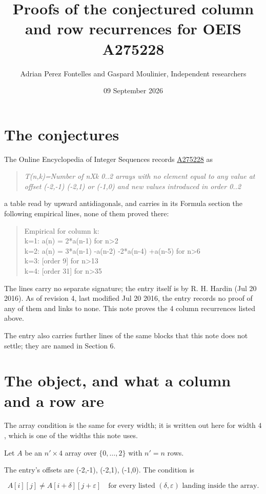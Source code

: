 \documentclass[11pt]{article}
\title{Proofs of the conjectured column and row recurrences for OEIS A275228}
\author{Adrian Perez Fontelles and Gaspard Moulinier, Independent researchers}
\date{09 September 2026}
\theoremstyle{definition}
\begin{document}
\maketitle
\section{The conjectures}

The Online Encyclopedia of Integer Sequences records \href{https://oeis.org/A275228}{A275228} as

\begin{quote}\itshape T(n,k)=Number of nXk 0..2 arrays with no element equal to any value at offset (-2,-1) (-2,1) or (-1,0) and new values introduced in order 0..2\end{quote}

a table read by upward antidiagonals, and carries in its Formula section the following empirical lines, none of them proved there:

\begin{quote}\ttfamily Empirical for column k:\\
k=1: a(n) = 2*a(n-1) for n>2\\k=2: a(n) = 3*a(n-1) -a(n-2) -2*a(n-4) +a(n-5) for n>6\\k=3: [order 9] for n>13\\k=4: [order 31] for n>35\end{quote}

The lines carry no separate signature; the entry itself is by R. H. Hardin (Jul 20 2016). As of revision 4, last modified Jul 20 2016, the entry records no proof of any of them and links to none. This note proves the 4 column recurrences listed above.

The entry also carries further lines of the same blocks that this note does not settle; they are named in Section 6.

\section{The object, and what a column and a row are}

The array condition is the same for every width; it is written out here for width $4$, which is one of the widths this note uses.

Let $A$ be an $n' \times 4$ array over $\{0,\dots,2\}$ with $n' = n$ rows.

The entry's offsets are (-2,-1), (-2,1), (-1,0). The condition is

\[A[i][j] \ne A[i{+}\delta][j{+}\varepsilon]\quad\text{for every listed }(\delta,\varepsilon)\text{ landing inside the array.}\]
\end{document}

